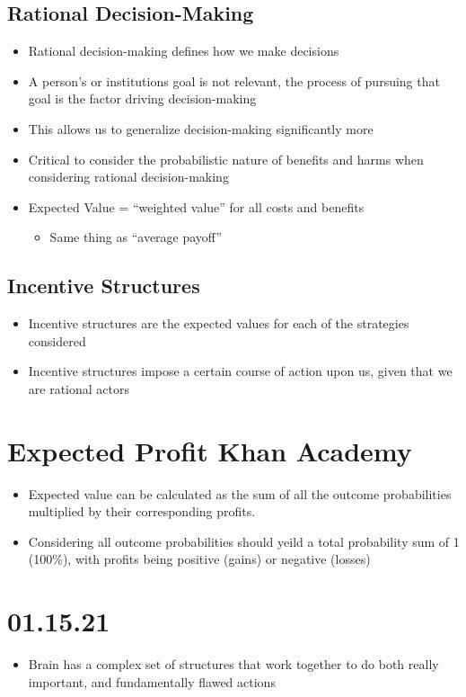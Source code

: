 \documentclass[11pt]{article}
\begin{document}
\subsection{Rational Decision-Making}
\label{sec:orgd2face5}
\begin{itemize}
\item Rational decision-making defines how we make decisions
\item A person's or institutions goal is not relevant, the process of pursuing that goal is the factor driving decision-making
\item This allows us to generalize decision-making significantly more
\item Critical to consider the probabilistic nature of benefits and harms when considering rational decision-making
\item Expected Value = ``weighted value'' for all costs and benefits
\begin{itemize}
\item Same thing as ``average payoff''
\end{itemize}
\end{itemize}
\subsection{Incentive Structures}
\label{sec:orgfcac1d6}
\begin{itemize}
\item Incentive structures are the expected values for each of the strategies considered
\item Incentive structures impose a certain course of action upon us, given that we are rational actors
\end{itemize}
\section{Expected Profit Khan Academy}
\label{sec:org06bec93}
\begin{itemize}
\item Expected value can be calculated as the sum of all the outcome probabilities multiplied by their corresponding profits.
\item Considering all outcome probabilities should yeild a total probability sum of 1 (100\%), with profits being positive (gains) or negative (losses)
\end{itemize}
\section{01.15.21}
\label{sec:org1c3541d}
\begin{itemize}
\item Brain has a complex set of structures that work together to do both really important, and fundamentally flawed actions
\end{itemize}
\end{document}
